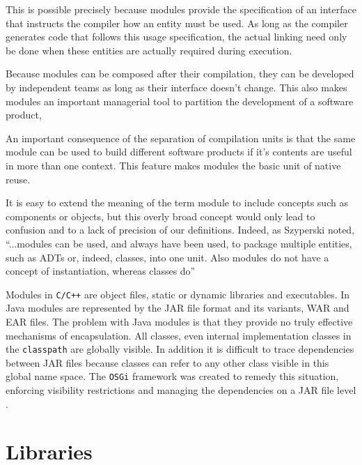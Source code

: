 This is possible precisely because modules provide the specification of an interface that instructs the compiler how an entity must be used. As long
as the compiler generates code that follows this usage specification, the actual linking need only be done when these entities are actually required
during execution.

Because modules can be composed after their compilation, they can be developed by independent teams as long as their interface doesn't change.
This also makes modules an important managerial tool to partition the development of a software product,

An important consequence of the separation of compilation units is that the same module can be used to build different software products if it's
contents are useful in more than one context. This feature makes modules the basic unit of native reuse. 

It is easy to extend the meaning of the term module to include concepts such as components or objects, but this overly broad concept
would only lead to confusion and to a lack of precision of our definitions. Indeed, as Szyperski noted, ``...modules can be used, and
always have been used, to package multiple entities, such as ADTs or, indeed, classes, into one unit. Also modules do not have a concept
of instantiation, whereas classes do''

Modules in \texttt{C/C++} are object files, static or dynamic libraries and executables. In Java modules are represented by the JAR file format and
its variants, WAR and EAR files. The problem with Java modules is that they provide no truly effective mechanisms of encapsulation. All classes, even
internal implementation classes in the \texttt{classpath} are globally visible. In addition it is difficult to trace dependencies between JAR files
because classes can refer to any other class visible in this global name space. The \texttt{OSGi} framework was created to remedy this situation,
enforcing visibility restrictions and managing the dependencies on a JAR file level \cite{Hall}.





\section{Libraries}
\label{sec:libraries}


